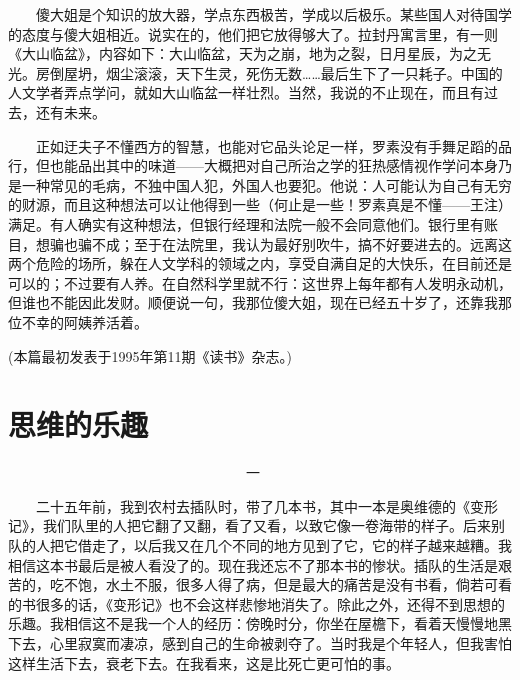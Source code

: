 　　傻大姐是个知识的放大器，学点东西极苦，学成以后极乐。某些国人对待国学的态度与傻大姐相近。说实在的，他们把它放得够大了。拉封丹寓言里，有一则《大山临盆》，内容如下：大山临盆，天为之崩，地为之裂，日月星辰，为之无光。房倒屋坍，烟尘滚滚，天下生灵，死伤无数……最后生下了一只耗子。中国的人文学者弄点学问，就如大山临盆一样壮烈。当然，我说的不止现在，而且有过去，还有未来。 

　　正如迂夫子不懂西方的智慧，也能对它品头论足一样，罗素没有手舞足蹈的品行，但也能品出其中的味道——大概把对自己所治之学的狂热感情视作学问本身乃是一种常见的毛病，不独中国人犯，外国人也要犯。他说：人可能认为自己有无穷的财源，而且这种想法可以让他得到一些（何止是一些！罗素真是不懂——王注）满足。有人确实有这种想法，但银行经理和法院一般不会同意他们。银行里有账目，想骗也骗不成；至于在法院里，我认为最好别吹牛，搞不好要进去的。远离这两个危险的场所，躲在人文学科的领域之内，享受自满自足的大快乐，在目前还是可以的；不过要有人养。在自然科学里就不行：这世界上每年都有人发明永动机，但谁也不能因此发财。顺便说一句，我那位傻大姐，现在已经五十岁了，还靠我那位不幸的阿姨养活着。 


(本篇最初发表于1995年第11期《读书》杂志。)

\chapter{思维的乐趣}

　　　　　　　　　　　　　　　　　一 

　　二十五年前，我到农村去插队时，带了几本书，其中一本是奥维德的《变形记》，我们队里的人把它翻了又翻，看了又看，以致它像一卷海带的样子。后来别队的人把它借走了，以后我又在几个不同的地方见到了它，它的样子越来越糟。我相信这本书最后是被人看没了的。现在我还忘不了那本书的惨状。插队的生活是艰苦的，吃不饱，水土不服，很多人得了病，但是最大的痛苦是没有书看，倘若可看的书很多的话，《变形记》也不会这样悲惨地消失了。除此之外，还得不到思想的乐趣。我相信这不是我一个人的经历：傍晚时分，你坐在屋檐下，看着天慢慢地黑下去，心里寂寞而凄凉，感到自己的生命被剥夺了。当时我是个年轻人，但我害怕这样生活下去，衰老下去。在我看来，这是比死亡更可怕的事。 

